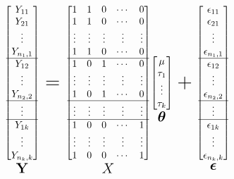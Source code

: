 \documentclass[]{book}
\newcommand{\E}{\boldsymbol\epsilon}
\theoremstyle{definition}
\theoremstyle{definition}
\theoremstyle{definition}
\theoremstyle{remark}
\begin{document}
\[
\underset{\huge \mathbf{Y}}{\begin{bmatrix}
  Y_{11} \\
  Y_{21} \\
  \vdots \\
  Y_{n_1, 1} \\ \hline
  Y_{12} \\
  \vdots \\
  Y_{n_2, 2} \\ \hline
  \vdots \\ \hline
  Y_{1k} \\
  \vdots \\
  Y_{n_k, k}
\end{bmatrix}} = \underset{\huge X}{\begin{bmatrix}
  1 & 1 & 0 & \cdots & 0 \\
  1 & 1 & 0 & \cdots & 0 \\
  \vdots & \vdots & \vdots & \vdots & \vdots \\
  1 & 1 & 0 & \cdots & 0 \\ \hline
  1 & 0 & 1 & \cdots & 0 \\
  \vdots & \vdots & \vdots & \vdots & \vdots \\
  1 & 0 & 1 & \cdots & 0 \\ \hline
  \vdots & \vdots & \vdots & \vdots & \vdots \\ \hline
  1 & 0 & 0 & \cdots & 1 \\
  \vdots & \vdots & \vdots & \vdots & \vdots \\
  1 & 0 & 0 & \cdots & 1
\end{bmatrix}} \underset{\huge \boldsymbol\theta}{\begin{bmatrix}
  \mu \\
  \tau_1 \\
  \vdots \\
  \tau_k
\end{bmatrix}} + \underset{\huge \E}{\begin{bmatrix}
  \epsilon_{11} \\
  \epsilon_{21} \\
  \vdots \\
  \epsilon_{n_1, 1} \\ \hline
  \epsilon_{12} \\
  \vdots \\
  \epsilon_{n_2, 2} \\ \hline
  \vdots \\ \hline
  \epsilon_{1k} \\
  \vdots \\
  \epsilon_{n_k,k}
\end{bmatrix}}
\]
\end{document}
